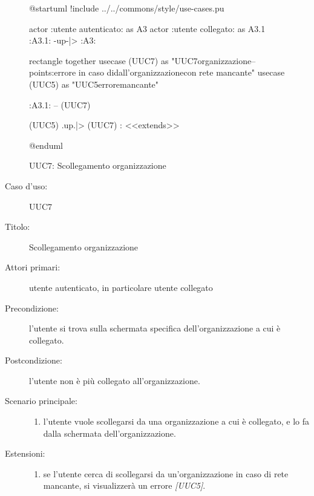 \documentclass[../../../analisi-dei-requisiti.tex]{subfiles}
\begin{document}
\begin{figure}[H]
  \centering
  \begin{plantuml}
  @startuml
  !include ../../commons/style/use-cases.pu

  actor :utente autenticato: as A3
  actor :utente collegato: as A3.1
  :A3.1: -up-|> :A3:

  rectangle {
    together {
      usecase (UUC7) as "UUC7\nScollegamento organizzazione\n--\nExtension points:\nVisualizzazione errore in caso di\nscollegamento dall'organizzazione\n con rete mancante"
      usecase (UUC5) as "UUC5\nVisualizzazione errore\nrete mancante"
    }
  }

  :A3.1: -- (UUC7)

  (UUC5) .up.|> (UUC7) : <<extends>>

  @enduml
    \end{plantuml}
  \caption{UUC7: Scollegamento organizzazione}
  \label{fig:uuc7}
\end{figure}

\begin{description}
  \item[Caso d’uso:] UUC7
  \item[Titolo:] Scollegamento organizzazione
  \item[Attori primari:] utente autenticato, in particolare utente collegato
  \item[Precondizione:] l'utente si trova sulla schermata specifica dell'organizzazione a cui è collegato.
  \item[Postcondizione:] l'utente non è più collegato all'organizzazione.
  \item[Scenario principale:]
        \begin{enumerate}
          \item l'utente vuole scollegarsi da una organizzazione a cui è collegato, e lo fa dalla schermata dell'organizzazione.
        \end{enumerate}
  \item[Estensioni:]
        \begin{enumerate}
          \item se l'utente cerca di scollegarsi da un'organizzazione in caso di rete mancante, si visualizzerà un errore \emph{[UUC5]}.
        \end{enumerate}
\end{description}
\end{document}
